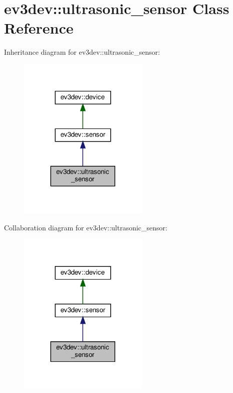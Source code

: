 \hypertarget{classev3dev_1_1ultrasonic__sensor}{}\section{ev3dev\+:\+:ultrasonic\+\_\+sensor Class Reference}
\label{classev3dev_1_1ultrasonic__sensor}


Inheritance diagram for ev3dev\+:\+:ultrasonic\+\_\+sensor\+:
\nopagebreak
\begin{figure}[H]
\begin{center}
\leavevmode
\includegraphics[width=176pt]{classev3dev_1_1ultrasonic__sensor__inherit__graph}
\end{center}
\end{figure}


Collaboration diagram for ev3dev\+:\+:ultrasonic\+\_\+sensor\+:
\nopagebreak
\begin{figure}[H]
\begin{center}
\leavevmode
\includegraphics[width=176pt]{classev3dev_1_1ultrasonic__sensor__coll__graph}
\end{center}
\end{figure}
